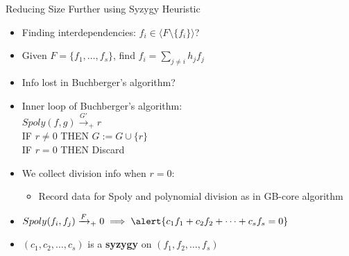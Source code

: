 \documentclass[xcolor=dvipsnames]{beamer}
\newcommand{\bi}{\begin{itemize}}
\newcommand{\ei}{\end{itemize}}
\begin{document}
\begin{frame}{\large{Reducing Size Further using Syzygy Heuristic}}
\bi
\item Finding interdependencies: $f_i\in\langle F\setminus\{f_i\}\rangle$?
\item Given $F=\{f_1,\dots,f_s\}$, find $f_i = \sum_{j\neq i} h_jf_j$
\item Info lost in Buchberger's algorithm?
\item Inner loop of Buchberger's algorithm: \\
\hspace{0.2in}  $Spoly(f, g) \stackrel{G'}{\textstyle\longrightarrow}_+
r$ \\
\hspace{0.2in}  \alert{IF $r \neq 0$} THEN $G:= G \cup \{r\}$ \\
\hspace{0.2in}  \alert{IF $r = 0$} THEN Discard 

\item We collect division info when $r = 0$:
	\bi
	\item Record data for Spoly and polynomial division as in GB-core algorithm
	\ei
\item $Spoly(f_i,f_j)\xrightarrow{F}_+ 0\implies \alert{c_1f_1+c_2f_2+\cdots+c_sf_s = 0}$
\pause
\item $(c_1,c_2,\dots,c_s)$ is a {\bf syzygy} on $(f_1,f_2,\dots,f_s)$
\ei
\end{frame}
\end{document}
